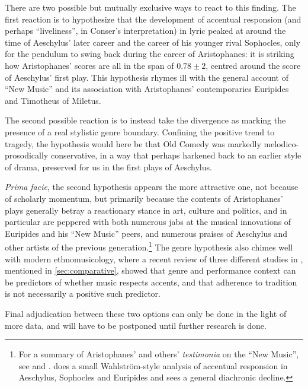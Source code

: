 \documentclass[twoside]{article}
\begin{document}
There are two possible but mutually exclusive ways to react to this finding. The first reaction is to hypothesize that the development of accentual responsion (and perhaps ``liveliness'', in Conser's interpretation) in lyric peaked at around the time of Aeschylus' later career and the career of his younger rival Sophocles, only for the pendulum to swing back during the career of Aristophanes: it is striking how Aristophanes' scores are all in the span of $0.78\pm2$, centred around the score of Aeschylus' first play. This hypothesis rhymes ill with the general account of ``New Music'' and its association with Aristophanes' contemporaries Euripides and Timotheus of Miletus.

The second possible reaction is to instead take the divergence as marking the presence of a real stylistic genre boundary. Confining the positive trend to tragedy, the hypothesis would here be that Old Comedy was markedly melodico-prosodically conservative, in a way that perhaps harkened back to an earlier style of drama, preserved for us in the first plays of Aeschylus.

\textit{Prima facie}, the second hypothesis appears the more attractive one, not because of scholarly momentum, but primarily because the contents of Aristophanes' plays generally betray a reactionary stance in art, culture and politics, and in particular are peppered with both numerous jabs at the musical innovations of Euripides and his ``New Music'' peers, and numerous praises of Aeschylus and other artists of the previous generation.\footnote{For a summary of Aristophanes' and others' \textit{testimonia} on the ``New Music'', see \textcite{dangourNewMusicWhats2006} and \textcite{dangourOldNewMusic2020}. \textcite{comottiMelodiaAccentoDi1989} does a small Wahlström-style analysis of accentual responsion in Aeschylus, Sophocles and Euripides and sees a general diachronic decline.} The genre hypothesis also chimes well with modern ethnomusicology, where a recent review of three different studies in \textcite[271]{schellenbergDoesLanguageDetermine2012}, mentioned in \autoref{sec:comparative}, showed that genre and performance context can be predictors of whether music respects accents, and that adherence to tradition is not necessarily a positive such predictor.

Final adjudication between these two options can only be done in the light of more data, and will have to be postponed until further research is done.

\end{document}

